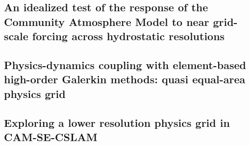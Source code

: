 \documentclass[12pt]{article}
\begin{document}
\newpage
\begin{center}
\section{An idealized test of the response of the Community Atmosphere Model to near grid-scale forcing across hydrostatic resolutions}
\end{center}


\newpage
\begin{center}
\section{Physics-dynamics coupling with element-based high-order Galerkin methods: quasi equal-area physics grid}
\end{center}


\newpage
\begin{center}
\section{Exploring a lower resolution physics grid in CAM-SE-CSLAM}
\end{center}

\end{document}
